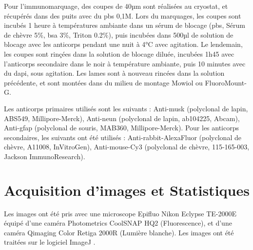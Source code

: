 	Pour l'immunomarquage, des coupes de 40µm sont réalisées au cryostat, et récupérés dans des puits avec du \gls{pbs} 0,1M. Lors du marquages, les coupes sont incubés 1 heure à températures ambiante dans un sérum de blocage (\gls{pbs}, Sérum de chèvre 5\%, \acrshort{bsa} 3\%, Triton 0.2\%), puis  incubées dans 500µl de solution de blocage avec les anticorps pendant une nuit à 4°C avec agitation. Le lendemain, les coupes sont rinçées dans la solution de blocage diluée, incubées 1h45 avec l'anticorps secondaire dans le noir à température ambiante, puis 10 minutes avec du \gls{dapi}, sous agitation. Les lames sont à nouveau rincées dans la solution précédente, et sont montées dans du milieu de montage Mowiol ou FluoroMount-G.
	
	Les anticorps primaires utilisés sont les suivants : Anti-\acrshort{musk} (polyclonal de lapin, ABS549, Millipore-Merck),  Anti-\acrshort{neun} (polyclonal de lapin, ab104225, Abcam), Anti-\acrshort{gfap} (polyclonal de souris, MAB360, Millipore-Merck). Pour les anticorps secondaires, les suivants ont été utilisés : Anti-rabbit-AlexaFluor (polyclonal de chèvre, A11008, InVitroGen), Anti-mouse-Cy3 (polyclonal de chèvre, 115-165-003, Jackson ImmunoResearch).
	
\section{Acquisition d'images et Statistiques}
\label{sec:ImagesStats}
	Les images ont été pris avec une microscope Epifluo Nikon Eclypse TE-2000E équipé d'une caméra Photometrics CoolSNAP HQ2 (Fluorescence), et d'une caméra Qimaging Color Retiga 2000R (Lumière blanche).
	Les images ont été traitées sur le logiciel ImageJ \cite{Schneider2012}.